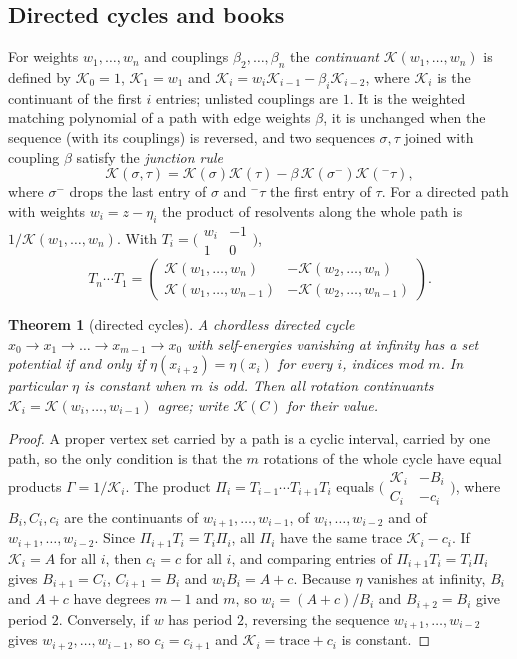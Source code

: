 \documentclass[11pt]{amsart}
\theoremstyle{plain}
\newtheorem{theorem}{Theorem}[section]
\theoremstyle{definition}
\theoremstyle{remark}
\numberwithin{equation}{section}
\newcommand{\cont}{\mathcal{K}}           %
\begin{document}
\subsection{Directed cycles and books}\label{ssec:setpot-cycles}
For weights $w_1,\dots,w_n$ and couplings $\beta_2,\dots,\beta_n$ the \emph{continuant} $\cont(w_1,\dots,w_n)$ is defined by $\cont_0=1$, $\cont_1=w_1$ and $\cont_i=w_i\cont_{i-1}-\beta_i\cont_{i-2}$, where $\cont_i$ is the continuant of the first $i$ entries; unlisted couplings are $1$. It is the weighted matching polynomial of a path with edge weights $\beta$, it is unchanged when the sequence (with its couplings) is reversed, and two sequences $\sigma,\tau$ joined with coupling $\beta$ satisfy the \emph{junction rule}
\[
\cont(\sigma,\tau)=\cont(\sigma)\cont(\tau)-\beta\,\cont(\sigma^{-})\cont({}^{-}\tau),
\]
where $\sigma^{-}$ drops the last entry of $\sigma$ and ${}^{-}\tau$ the first entry of $\tau$. For a directed path with weights $w_i=z-\eta_i$ the product of resolvents along the whole path is $1/\cont(w_1,\dots,w_n)$. With $T_i=\bigl(\begin{smallmatrix}w_i&-1\\1&0\end{smallmatrix}\bigr)$,
\[
T_n\cdots T_1=\begin{pmatrix}\cont(w_1,\dots,w_n)&-\cont(w_2,\dots,w_n)\\ \cont(w_1,\dots,w_{n-1})&-\cont(w_2,\dots,w_{n-1})\end{pmatrix}.
\]

\begin{theorem}[directed cycles]\label{thm:set-cycles}
A chordless directed cycle $x_0\to x_1\to\dots\to x_{m-1}\to x_0$ with self-energies vanishing at infinity has a set potential if and only if $\eta(x_{i+2})=\eta(x_i)$ for every $i$, indices mod $m$. In particular $\eta$ is constant when $m$ is odd. Then all rotation continuants $\cont_i=\cont(w_i,\dots,w_{i-1})$ agree; write $\cont(C)$ for their value.
\end{theorem}
\begin{proof}
A proper vertex set carried by a path is a cyclic interval, carried by one path, so the only condition is that the $m$ rotations of the whole cycle have equal products $\Gamma=1/\cont_i$. The product $\Pi_i=T_{i-1}\cdots T_{i+1}T_i$ equals $\bigl(\begin{smallmatrix}\cont_i&-B_i\\C_i&-c_i\end{smallmatrix}\bigr)$, where $B_i,C_i,c_i$ are the continuants of $w_{i+1},\dots,w_{i-1}$, of $w_i,\dots,w_{i-2}$ and of $w_{i+1},\dots,w_{i-2}$. Since $\Pi_{i+1}T_i=T_i\Pi_i$, all $\Pi_i$ have the same trace $\cont_i-c_i$. If $\cont_i=A$ for all $i$, then $c_i=c$ for all $i$, and comparing entries of $\Pi_{i+1}T_i=T_i\Pi_i$ gives $B_{i+1}=C_i$, $C_{i+1}=B_i$ and $w_iB_i=A+c$. Because $\eta$ vanishes at infinity, $B_i$ and $A+c$ have degrees $m-1$ and $m$, so $w_i=(A+c)/B_i$ and $B_{i+2}=B_i$ give period $2$. Conversely, if $w$ has period $2$, reversing the sequence $w_{i+1},\dots,w_{i-2}$ gives $w_{i+2},\dots,w_{i-1}$, so $c_i=c_{i+1}$ and $\cont_i=\text{trace}+c_i$ is constant.
\end{proof}
\end{document}
